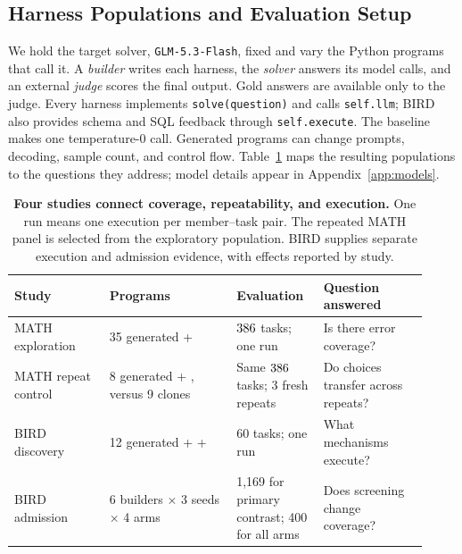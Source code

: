\subsection{Harness Populations and Evaluation Setup}
\label{sec:interface}
We hold the target solver, \texttt{GLM-5.3-Flash}, fixed and vary the
Python programs that call it. A \emph{builder} writes each harness,
the \emph{solver} answers its model calls, and an external \emph{judge}
scores the final output. Gold answers are available only to the judge.
Every harness implements \texttt{solve(question)} and calls
\texttt{self.llm}; BIRD also provides schema and SQL feedback through
\texttt{self.execute}. The \bare{} baseline makes one temperature-$0$
call. Generated programs can change prompts, decoding, sample count,
and control flow. Table~\ref{tab:study-map} maps the resulting populations
to the questions they address; model details appear in
Appendix~\ref{app:models}.

\begin{table}[t]
\centering\small
\setlength{\tabcolsep}{4pt}
\begin{tabular}{@{}p{0.21\linewidth}p{0.29\linewidth}p{0.19\linewidth}p{0.23\linewidth}@{}}
\toprule
Study & Programs & Evaluation & Question answered \\
\midrule
MATH exploration & 35 generated + \bare{} & $386$ tasks; one run & Is there error coverage? \\
MATH repeat control & 8 generated + \bare{}, versus 9 clones & Same $386$ tasks; 3 fresh repeats & Do choices transfer across repeats? \\
BIRD discovery & 12 generated + \bare{} + \react{} & 60 tasks; one run & What mechanisms execute? \\
BIRD admission & 6 builders $\times$ 3 seeds $\times$ 4 arms & 1,169 for primary contrast; 400 for all arms & Does screening change coverage? \\
\bottomrule
\end{tabular}
\caption{\textbf{Four studies connect coverage, repeatability, and execution.} One run
means one execution per member--task pair. The repeated MATH panel is
selected from the exploratory population. BIRD supplies separate
execution and admission evidence, with effects reported by study.}
\label{tab:study-map}
\end{table}

